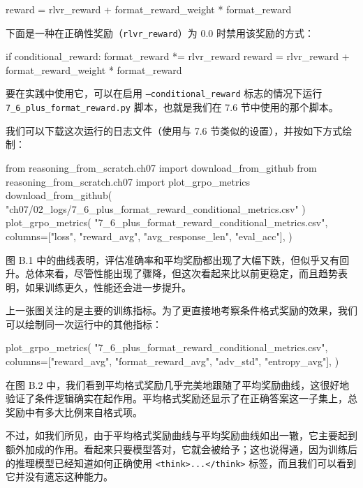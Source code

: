\begin{codebox}
reward = rlvr_reward + format_reward_weight * format_reward
\end{codebox}

下面是一种在正确性奖励（\texttt{rlvr\_reward}）为 0.0 时禁用该奖励的方式：

\begin{codebox}
if conditional_reward:
    format_reward *= rlvr_reward
reward = rlvr_reward + format_reward_weight * format_reward
\end{codebox}

要在实践中使用它，可以在启用 \texttt{--conditional\_reward} 标志的情况下运行 \texttt{7\_6\_plus\_format\_reward.py} 脚本，也就是我们在 7.6 节中使用的那个脚本。

我们可以下载这次运行的日志文件（使用与 7.6 节类似的设置），并按如下方式绘制：

\begin{codebox}
from reasoning_from_scratch.ch07 import download_from_github
from reasoning_from_scratch.ch07 import plot_grpo_metrics
download_from_github(
    "ch07/02_logs/7_6_plus_format_reward_conditional_metrics.csv"
)
plot_grpo_metrics(
    "7_6_plus_format_reward_conditional_metrics.csv",
    columns=["loss", "reward_avg", "avg_response_len", "eval_acc"],
)
\end{codebox}


图 B.1 中的曲线表明，评估准确率和平均奖励都出现了大幅下跌，但似乎又有回升。总体来看，尽管性能出现了骤降，但这次看起来比以前更稳定，而且趋势表明，如果训练更久，性能还会进一步提升。

上一张图关注的是主要的训练指标。为了更直接地考察条件格式奖励的效果，我们可以绘制同一次运行中的其他指标：

\begin{codebox}
plot_grpo_metrics(
    "7_6_plus_format_reward_conditional_metrics.csv",
    columns=["reward_avg", "format_reward_avg", "adv_std", "entropy_avg"],
)
\end{codebox}


在图 B.2 中，我们看到平均格式奖励几乎完美地跟随了平均奖励曲线，这很好地验证了条件逻辑确实在起作用。平均格式奖励还显示了在正确答案这一子集上，总奖励中有多大比例来自格式项。

不过，如我们所见，由于平均格式奖励曲线与平均奖励曲线如出一辙，它主要起到额外加成的作用。看起来只要模型答对，它就会被给予；这也说得通，因为训练后的推理模型已经知道如何正确使用 \texttt{\textless{}think\textgreater{}...\textless{}/think\textgreater{}} 标签，而且我们可以看到它并没有遗忘这种能力。


